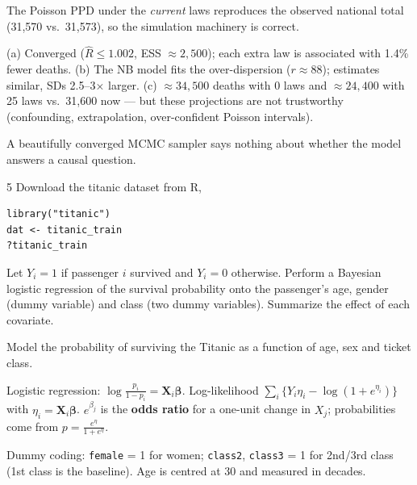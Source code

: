 \documentclass[11pt]{article}
\begin{document}
\begin{sanity}
The Poisson PPD under the \emph{current} laws reproduces the observed national total (31{,}570 vs.\ 31{,}573), so the simulation machinery is correct. \checkmark
\end{sanity}

\begin{answer}
(a) Converged ($\hat R\le1.002$, ESS $\approx2{,}500$); each extra law is associated with 1.4\% fewer deaths. (b) The NB model fits the over-dispersion ($r\approx88$); estimates similar, SDs 2.5--3$\times$ larger. (c) $\approx34{,}500$ deaths with 0 laws and $\approx24{,}400$ with 25 laws vs.\ 31{,}600 now --- but these projections are not trustworthy (confounding, extrapolation, over-confident Poisson intervals).
\end{answer}

\begin{takeaway}
A beautifully converged MCMC sampler says nothing about whether the model answers a causal question.
\end{takeaway}


\begin{problem}{5}
Download the titanic dataset from R,
\begin{lstlisting}
library("titanic")
dat <- titanic_train
?titanic_train
\end{lstlisting}
Let $Y_i=1$ if passenger $i$ survived and $Y_i=0$ otherwise. Perform a Bayesian logistic regression of the survival probability onto the passenger's age, gender (dummy variable) and class (two dummy variables). Summarize the effect of each covariate.
\end{problem}

\begin{restate}
Model the probability of surviving the Titanic as a function of age, sex and ticket class.
\end{restate}

\begin{recall}
Logistic regression: $\log\frac{p_i}{1-p_i}=\mathbf X_i\bm\beta$. Log-likelihood $\sum_i\{Y_i\eta_i-\log(1+e^{\eta_i})\}$ with $\eta_i=\mathbf X_i\bm\beta$. $e^{\beta_j}$ is the \textbf{odds ratio} for a one-unit change in $X_j$; probabilities come from $p=\frac{e^\eta}{1+e^\eta}$.
\end{recall}

\begin{keyidea}
Dummy coding: \texttt{female} = 1 for women; \texttt{class2}, \texttt{class3} = 1 for 2nd/3rd class (1st class is the baseline). Age is centred at 30 and measured in decades.
\end{keyidea}
\end{document}

